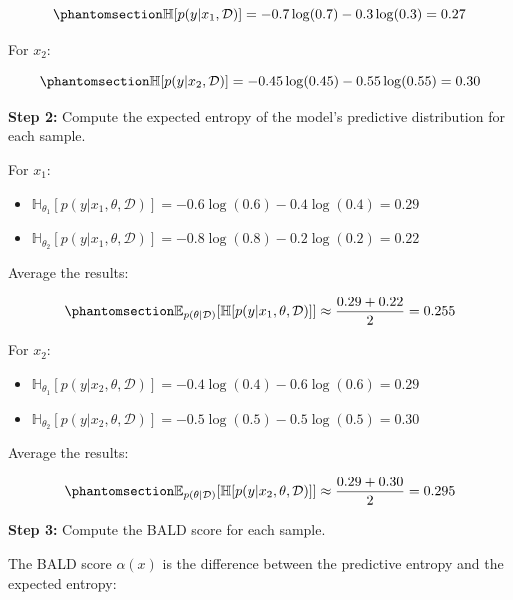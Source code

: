 \documentclass[
  letterpaper,
  numbers=noenddot,
  DIV=11]{scrreprt}
\providecommand{\tightlist}{%
  \setlength{\itemsep}{0pt}\setlength{\parskip}{0pt}}\usepackage{longtable,booktabs,array}
\theoremstyle{plain}
\theoremstyle{definition}
\theoremstyle{plain}
\theoremstyle{remark}
\begin{document}
\begin{equation}\phantomsection\label{eq-eq3.10}{
\mathbb{H}[p(y|x_1, \mathcal{D})] = - 0.7 \log(0.7) - 0.3 \log(0.3) = 0.27
}\end{equation}

For \(x_2\):

\begin{equation}\phantomsection\label{eq-eq3.11}{
\mathbb{H}[p(y|x_2, \mathcal{D})] = - 0.45 \log(0.45) - 0.55 \log(0.55) = 0.30
}\end{equation}

\textbf{Step 2:} Compute the expected entropy of the model's predictive
distribution for each sample.

For \(x_1\):

\begin{itemize}
\tightlist
\item
  \(\mathbb{H}_{\theta_1}[p(y|x_1, \theta, \mathcal{D})] = -0.6 \log(0.6) - 0.4 \log(0.4) = 0.29\)
\item
  \(\mathbb{H}_{\theta_2}[p(y|x_1, \theta, \mathcal{D})] = -0.8 \log(0.8) - 0.2 \log(0.2) = 0.22\)
\end{itemize}

Average the results:

\begin{equation}\phantomsection\label{eq-eq3.12}{
\mathbb{E}_{p(\theta|\mathcal{D})}[\mathbb{H}[p(y|x_1, \theta, \mathcal{D})]] \approx \frac{0.29 + 0.22}{2} = 0.255
}\end{equation}

For \(x_2\):

\begin{itemize}
\tightlist
\item
  \(\mathbb{H}_{\theta_1}[p(y|x_2, \theta, \mathcal{D})] = -0.4 \log(0.4) - 0.6 \log(0.6) = 0.29\)
\item
  \(\mathbb{H}_{\theta_2}[p(y|x_2, \theta, \mathcal{D})] = -0.5 \log(0.5) - 0.5 \log(0.5) = 0.30\)
\end{itemize}

Average the results:

\begin{equation}\phantomsection\label{eq-eq3.13}{
\mathbb{E}_{p(\theta|\mathcal{D})}[\mathbb{H}[p(y|x_2, \theta, \mathcal{D})]] \approx \frac{0.29 + 0.30}{2} = 0.295
}\end{equation}

\textbf{Step 3:} Compute the BALD score for each sample.

The BALD score \(\alpha(x)\) is the difference between the predictive
entropy and the expected entropy:
\end{document}
